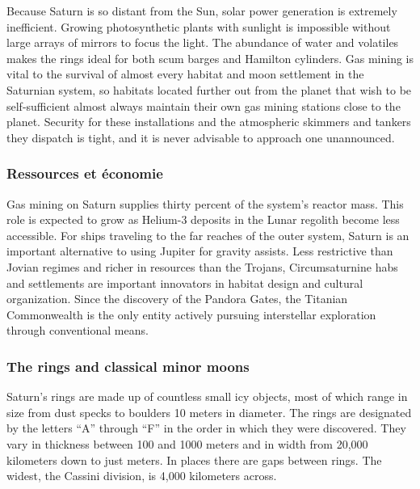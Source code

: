 Because Saturn is so distant from the Sun, solar power generation is extremely inefficient. Growing photosynthetic plants with sunlight is impossible without large arrays of mirrors to focus the light. The abundance of water and volatiles makes the rings ideal for both scum barges and Hamilton cylinders. Gas mining is vital to the survival of almost every habitat and moon settlement in the Saturnian system, so habitats located further out from the planet that wish to be self-sufficient almost always maintain their own gas mining stations close to the planet. Security for these installations and the atmospheric skimmers and tankers they dispatch is tight, and it is never advisable to approach one unannounced. 

\subsubsection{Ressources et économie} \label{sec:saturn-resources-economics} 

Gas mining on Saturn supplies thirty percent of the system's reactor mass. This role is expected to grow as Helium-3 deposits in the Lunar regolith become less accessible. For ships traveling to the far reaches of the outer system, Saturn is an important alternative to using Jupiter for gravity assists. Less restrictive than Jovian regimes and richer in resources than the Trojans, Circumsaturnine habs and settlements are important innovators in habitat design and cultural organization. Since the discovery of the Pandora Gates, the Titanian Commonwealth is the only entity actively pursuing interstellar exploration through conventional means. 

\subsubsection{The rings and classical minor moons} \label{sec:rings-class-minor} 

Saturn's rings are made up of countless small icy objects, most of which range in size from dust specks to boulders 10 meters in diameter. The rings are designated by the letters “A” through “F” in the order in which they were discovered. They vary in thickness between 100 and 1000 meters and in width from 20,000 kilometers down to just meters. In places there are gaps between rings. The widest, the Cassini division, is 4,000 kilometers across. 





